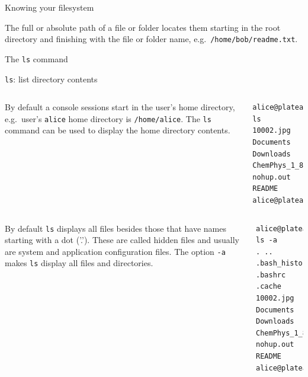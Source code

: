 \begin{frame}{Knowing your filesystem}
      
 \vspace{-5cm}
  \begin{block}
    {\footnotesize The full or absolute path of a file or folder
      locates them starting in the root directory and finishing
      with the file or folder name, e.g.\ \texttt{/home/bob/readme.txt}.}  
  \end{block}

\end{frame}
\begin{frame}[fragile]{The \texttt{ls} command}
  
  \begin{block}{ \alert{\texttt{ls}}: list directory contents}
    
    \begin{columns}
      {\footnotesize By default a console sessions start in the user's home directory, e.g.\ user's \texttt{alice} home directory is \texttt{/home/alice}. The \texttt{ls} command can be used to display the home directory contents.}
    {\scriptsize
      \begin{lstlisting}
alice@platea:~$ ls
10002.jpg Documents Downloads  
ChemPhys_1_84.pdf nohup.out README
alice@platea:~$
\end{lstlisting}
}
\end{columns}


\vspace{0.5cm}
\begin{columns}
      {\footnotesize By default \texttt{ls} displays all files besides those that have names starting with a dot ('.'). These are called \alert{hidden files} and usually are system and application configuration files. The option \texttt{-a} makes \texttt{ls} display all files and directories.}
    {\scriptsize
      \begin{lstlisting}
alice@platea:~$ ls -a
. .. .bash_history .bashrc 
.cache 10002.jpg Documents  Downloads  
ChemPhys_1_84.pdf nohup.out  README
alice@platea:~$
\end{lstlisting}
}
\end{columns}

    \end{block}


\end{frame}
